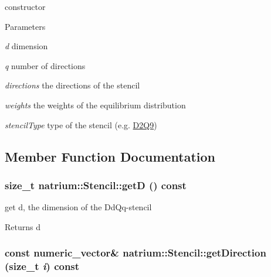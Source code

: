 constructor 
\begin{DoxyParams}{Parameters}
\item[{\em d}]dimension \item[{\em q}]number of directions \item[{\em directions}]the directions of the stencil \item[{\em weights}]the weights of the equilibrium distribution \item[{\em stencilType}]type of the stencil (e.g. \hyperlink{classnatrium_1_1D2Q9}{D2Q9}) \end{DoxyParams}


\subsection{Member Function Documentation}
\hypertarget{classnatrium_1_1Stencil_a55ee00e8c03b266c7eeed3964d2c93bf}{
\subsubsection[{getD}]{\setlength{\rightskip}{0pt plus 5cm}size\_\-t natrium::Stencil::getD () const}}
\label{classnatrium_1_1Stencil_a55ee00e8c03b266c7eeed3964d2c93bf}


get d, the dimension of the DdQq-\/stencil \begin{DoxyReturn}{Returns}
d 
\end{DoxyReturn}
\hypertarget{classnatrium_1_1Stencil_a76b179032543b3436dea199beceab000}{
\subsubsection[{getDirection}]{\setlength{\rightskip}{0pt plus 5cm}const numeric\_\-vector\& natrium::Stencil::getDirection (size\_\-t {\em i}) const}}
\label{classnatrium_1_1Stencil_a76b179032543b3436dea199beceab000}


